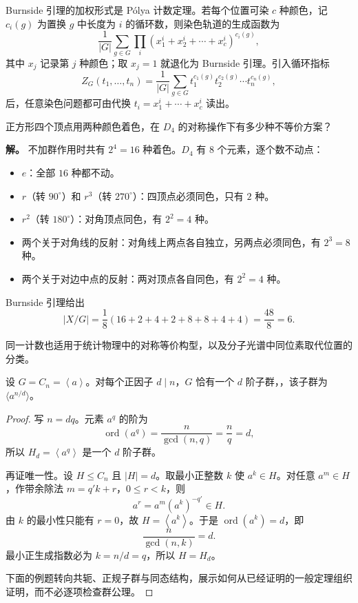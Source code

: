 Burnside 引理的加权形式是 Pólya 计数定理。若每个位置可染 $c$ 种颜色，记 $c_i(g)$ 为置换 $g$ 中长度为 $i$ 的循环数，则染色轨道的生成函数为
\begin{equation*}
\frac{1}{|G|}\sum_{g\in G}\prod_{i}\left(x_1^i+x_2^i+\cdots+x_c^i\right)^{c_i(g)},
\end{equation*}
其中 $x_j$ 记录第 $j$ 种颜色；取 $x_j=1$ 就退化为 Burnside 引理。引入循环指标
\begin{equation*}
Z_G(t_1,\dots,t_n)=\frac{1}{|G|}\sum_{g\in G}t_1^{c_1(g)}t_2^{c_2(g)}\cdots t_n^{c_n(g)},
\end{equation*}
后，任意染色问题都可由代换 $t_i=x_1^i+\cdots+x_c^i$ 读出。\begin{example}
正方形四个顶点用两种颜色着色，在 $D_4$ 的对称操作下有多少种不等价方案？

\textbf{解。} 不加群作用时共有 $2^4=16$ 种着色。$D_4$ 有 $8$ 个元素，逐个数不动点：
\begin{itemize}
\item $e$：全部 $16$ 种都不动。
\item $r$（转 $90^\circ$）和 $r^3$（转 $270^\circ$）：四顶点必须同色，只有 $2$ 种。
\item $r^2$（转 $180^\circ$）：对角顶点同色，有 $2^2=4$ 种。
\item 两个关于对角线的反射：对角线上两点各自独立，另两点必须同色，有 $2^3=8$ 种。
\item 两个关于对边中点的反射：两对顶点各自同色，有 $2^2=4$ 种。
\end{itemize}
Burnside 引理给出
\[
\lvert X/G\rvert=\frac18(16+2+4+2+8+8+4+4)=\frac{48}{8}=6.
\]

同一计数也适用于统计物理中的对称等价构型，以及分子光谱中同位素取代位置的分类。
\end{example}


\par
\begin{proposition}[循环群的子群]
设 $G=C_n=\left\langle a\right\rangle$。对每个正因子 $d\mid n$，$G$ 恰有一个 $d$ 阶子群，，该子群为 $\langle a^{n/d}\rangle$。
\end{proposition}

\begin{proof}
写 $n=dq$。元素 $a^q$ 的阶为
\[
\operatorname{ord}(a^q)=\frac{n}{\gcd(n,q)}=\frac{n}{q}=d,
\]
所以 $H_d=\left\langle a^q\right\rangle$ 是一个 $d$ 阶子群。

再证唯一性。设 $H\leqslant C_n$ 且 $|H|=d$。取最小正整数 $k$ 使 $a^k\in H$。对任意 $a^m\in H$，作带余除法 $m=q'k+r$，$0\le r<k$，则
\[
a^r=a^m(a^k)^{-q'}\in H.
\]
由 $k$ 的最小性只能有 $r=0$，故 $H=\left\langle a^k\right\rangle$。于是 $\operatorname{ord}(a^k)=d$，即
\[
\frac{n}{\gcd(n,k)}=d.
\]
最小正生成指数必为 $k=n/d=q$，所以 $H=H_d$。

下面的例题转向共轭、正规子群与同态结构，展示如何从已经证明的一般定理组织证明，而不必逐项检查群公理。
\end{proof}
\par

